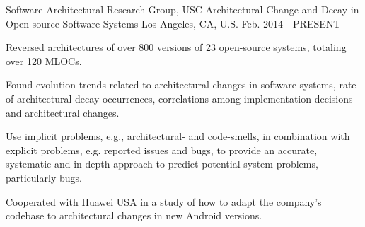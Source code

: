 \begin{cventries}
  \cventry
    {{Software Architectural Research Group}, USC} %
    {Architectural Change and Decay in Open-source Software Systems} %
    {Los Angeles, CA, U.S.} %
    {Feb. 2014 - PRESENT} %
    {
      \begin{cvitems} %
        \item Reversed architectures of over 800 versions of 23 open-source systems, totaling over 120 MLOCs.
        \item Found evolution trends related to architectural changes in software systems, rate of architectural decay occurrences, correlations among implementation decisions and architectural changes.
        \item Use implicit problems, e.g.,
        architectural- and code-smells, in combination with explicit problems, e.g. reported issues and bugs, to provide an accurate, systematic and in depth approach to predict potential system problems, particularly bugs.
        \item Cooperated with Huawei USA in a study of how to adapt the company's codebase to architectural changes in new Android versions.
      \end{cvitems}
    }
   

\end{cventries}
